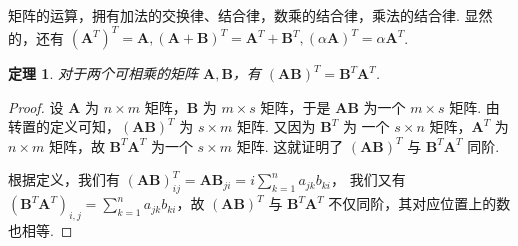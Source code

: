 \documentclass[a4paper]{article}
\newtheorem{theorem}{定理}[section]
\begin{document}
矩阵的运算，拥有加法的交换律、结合律，数乘的结合律，乘法的结合律. 显然的，还有 ${(\boldsymbol A^T)}^T=\boldsymbol A,(\boldsymbol A
+\boldsymbol B)^T=\boldsymbol A^T+\boldsymbol B^T,(\alpha \boldsymbol A)^T=\alpha\boldsymbol A^T$.

\begin{theorem}
    对于两个可相乘的矩阵 $\boldsymbol A,\boldsymbol B$，有 $(\boldsymbol A\boldsymbol B)^T=\boldsymbol B^T\boldsymbol A^T$.
\end{theorem}

\begin{proof}
    设 $\boldsymbol A$ 为 $n\times m$ 矩阵，$\boldsymbol B$ 为 $m\times s$ 矩阵，于是 $\boldsymbol A\boldsymbol B$ 为一个
    $m\times s$ 矩阵. 由转置的定义可知，$(\boldsymbol A\boldsymbol B)^T$ 为 $s\times m$ 矩阵. 又因为 $\boldsymbol B^T$ 为
    一个 $s\times n$ 矩阵，$\boldsymbol A^T$ 为 $n\times m$ 矩阵，故 $\boldsymbol B^T\boldsymbol A^T$ 为一个 $s\times m$
    矩阵. 这就证明了 $(\boldsymbol A\boldsymbol B)^T$ 与 $\boldsymbol B^T\boldsymbol A^T$ 同阶.

    根据定义，我们有 $(\boldsymbol A\boldsymbol B)^T_{ij}=\boldsymbol A\boldsymbol B_{ji}=i\sum\limits_{k=1}^n a_{jk}b_{ki}$，
    我们又有 $(\boldsymbol B^T\boldsymbol A^T)_{i,j}=\sum\limits_{k=1}^n a_{jk}b_{ki}$，故 $(\boldsymbol A\boldsymbol B)^T$ 
    与 $\boldsymbol B^T\boldsymbol A^T$ 不仅同阶，其对应位置上的数也相等.
\end{proof}
\end{document}

